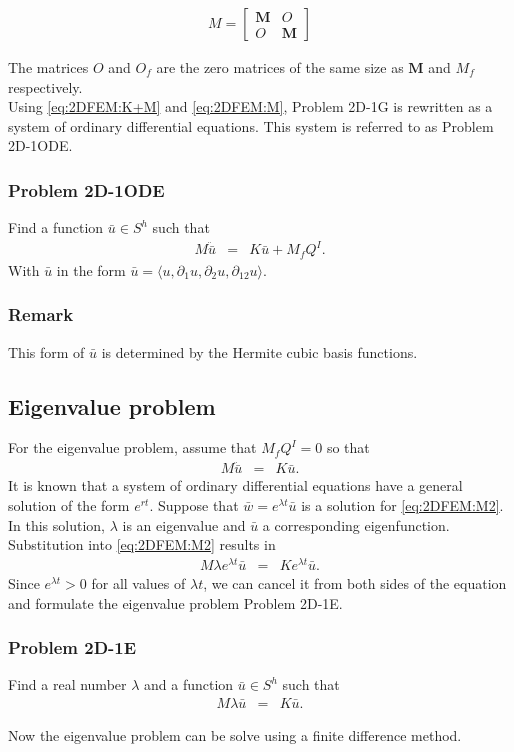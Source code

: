 \documentclass[../../main.tex]{subfiles}
\begin{document}
\begin{eqnarray}
	M = 
	\begin{bmatrix}
		\mathbf{M} & O \\
		O & \mathbf{M}
	\end{bmatrix}\label{eq:2DFEM:M}
\end{eqnarray}

The matrices ${O}$ and ${O_f}$ are the zero matrices of the same size as $\mathbf{M}$ and ${M_f}$ respectively.\\

Using \eqref{eq:2DFEM:K+M} and \eqref{eq:2DFEM:M}, Problem 2D-1G is rewritten as a system of ordinary differential equations. This system is referred to as Problem 2D-1ODE.

\subsubsection{Problem 2D-1ODE}
Find a function $\bar{u} \in S^h$ such that
\begin{eqnarray}
	M\ddot{\bar{u}} & = & K\bar{u} + M_{f}Q^I.
\end{eqnarray} With $\bar{u}$ in the form $\bar{u} = \langle u, \partial_1 u, \partial_2 u, \partial_{12} u \rangle$.

\subsubsection{Remark}
This form of $\bar{u}$ is determined by the Hermite cubic basis functions.

\subsection{Eigenvalue problem}\label{2dFEM_EP}
For the eigenvalue problem, assume that $M_{f}Q^I = 0$ so that 
\begin{eqnarray}
		M\ddot{\bar{u}} & = & K\bar{u}.\label{eq:2DFEM:M2}
\end{eqnarray}
It is known that a system of ordinary differential equations have a general solution of the form $e^{rt}$. Suppose that $\bar{w} = e^{\lambda t} \bar{u}$ is a solution for \eqref{eq:2DFEM:M2}. In this solution, $\lambda$ is an eigenvalue and $\bar{u}$ a corresponding eigenfunction. Substitution into \eqref{eq:2DFEM:M2} results in
\begin{eqnarray*}
	M\lambda e^{\lambda t}\bar{u} & = & Ke^{\lambda t}\bar{u}.
\end{eqnarray*}
Since $e^{\lambda t} > 0$ for all values of $\lambda t$, we can cancel it from both sides of the equation and formulate the eigenvalue problem Problem 2D-1E.

\subsubsection{Problem 2D-1E}
Find a real number $\lambda$ and a function $\bar{u} \in S^h$ such that
\begin{eqnarray}
	M\lambda{\bar{u}} & = & K\bar{u}.
\end{eqnarray}

Now the eigenvalue problem can be solve using a finite difference method.
\end{document}
